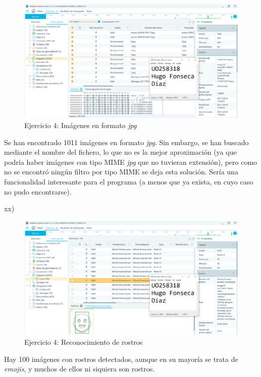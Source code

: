 \documentclass[11pt]{article}
\begin{document}
\begin{figure}[H]
    \caption{Ejercicio 4: Imágenes en formato \textit{jpg}}
    \centering
    \includegraphics[scale=0.4]{p04/e7-14.PNG}
\end{figure}

Se han encontrado 1011 imágenes en formato \textit{jpg}. Sin embargo, se han buscado mediante el nombre del fichero, lo que no es la mejor aproximación (ya que podría haber imágenes con tipo MIME \textit{jpg} que no tuvieran extensión), pero como no se encontró ningún filtro por tipo MIME se deja esta solución. Sería una funcionalidad interesante para el programa (a menos que ya exista, en cuyo caso no pudo encontrarse).

xx)

\begin{figure}[H]
    \caption{Ejercicio 4: Reconocimiento de rostros}
    \centering
    \includegraphics[scale=0.4]{p04/e7-15.PNG}
\end{figure}

Hay 100 imágenes con rostros detectados, aunque en su mayoría se trata de \textit{emojis}, y muchos de ellos ni siquiera son rostros.
\end{document}
